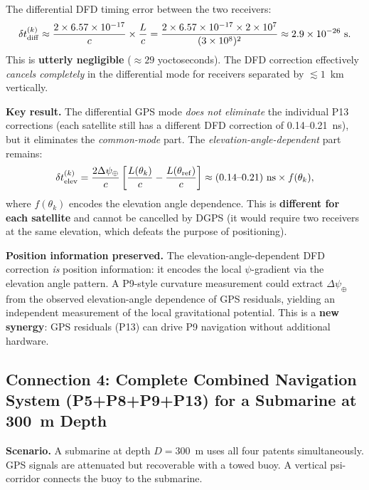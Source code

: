 \documentclass[aps,prd,twocolumn,superscriptaddress,nofootinbib]{revtex4-2}
\begin{document}
The differential DFD timing error between the two receivers:
\begin{equation}
\delta t_{\rm diff}^{(k)} \approx \frac{2\times 6.57\times 10^{-17}}{c}\times\frac{L}{c}
= \frac{2\times 6.57\times 10^{-17}\times 2\times 10^7}{(3\times 10^8)^2}
\approx 2.9\times 10^{-26}~\text{s}.
\end{equation}
This is \textbf{utterly negligible} ($\approx 29$ yoctoseconds).  The DFD
correction effectively \emph{cancels completely} in the differential mode
for receivers separated by $\lesssim 1$~km vertically.

\textbf{Key result.}  The differential GPS mode \emph{does not eliminate}
the individual P13 corrections (each satellite still has a different
DFD correction of 0.14--0.21~ns), but it eliminates the \emph{common-mode}
part.  The \emph{elevation-angle-dependent} part remains:
\begin{equation}
\delta t_{\rm elev}^{(k)} = \frac{2\Delta\psi_\oplus}{c}\left[\frac{L(\theta_k)}{c}
- \frac{L(\theta_{\rm ref})}{c}\right] \approx (0.14\text{--}0.21)~\text{ns} \times f(\theta_k),
\end{equation}
where $f(\theta_k)$ encodes the elevation angle dependence.  This is
\textbf{different for each satellite} and cannot be cancelled by DGPS
(it would require two receivers at the same elevation, which defeats
the purpose of positioning).

\textbf{Position information preserved.}
The elevation-angle-dependent DFD correction \emph{is} position information:
it encodes the local $\psi$-gradient via the elevation angle pattern.  A
P9-style curvature measurement could extract $\Delta\psi_\oplus$ from the
observed elevation-angle dependence of GPS residuals, yielding an independent
measurement of the local gravitational potential.  This is a \textbf{new
synergy}: GPS residuals (P13) can drive P9 navigation without additional hardware.

\subsection{Connection 4: Complete Combined Navigation System (P5+P8+P9+P13)
for a Submarine at 300~m Depth}
\label{sec:connection4}

\textbf{Scenario.}  A submarine at depth $D = 300$~m uses all four patents
simultaneously.  GPS signals are attenuated but recoverable with a towed
buoy.  A vertical psi-corridor connects the buoy to the submarine.
\end{document}
